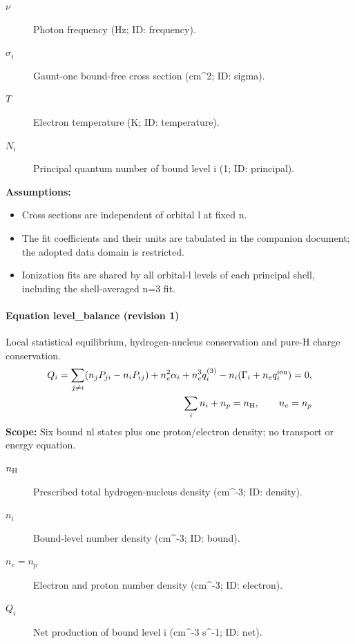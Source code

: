 \begin{description}
\item[$\nu$] Photon frequency (Hz; ID: frequency).
\item[$\sigma_i$] Gaunt-one bound-free cross section (cm\textasciicircum{}2; ID: sigma).
\item[$T$] Electron temperature (K; ID: temperature).
\item[$N_i$] Principal quantum number of bound level i (1; ID: principal).
\end{description}

\noindent\textbf{Assumptions:}
\begin{itemize}
\item Cross sections are independent of orbital l at fixed n.
\item The fit coefficients and their units are tabulated in the companion document; the adopted data domain is restricted.
\item Ionization fits are shared by all orbital-l levels of each principal shell, including the shell-averaged n=3 fit.
\end{itemize}

\paragraph{Equation level\_balance (revision 1)}
Local statistical equilibrium, hydrogen-nucleus conservation and pure-H charge conservation.
\begin{equation}
\begin{aligned}
Q_i=\sum_{j\ne i}(n_jP_{ji}-n_iP_{ij})+n_e^2\alpha_i+n_e^3q_i^{(3)}-n_i(\Gamma_i+n_eq_i^{\rm ion})=0,\\\sum_i n_i+n_p=n_{\rm H},\qquad n_e=n_p
\end{aligned}
\label{eq:escape.hydrogen_5f_nlte:level_5f_balance:1}
\end{equation}
\noindent\textbf{Scope:} Six bound nl states plus one proton/electron density; no transport or energy equation.

\begin{description}
\item[$n_{\rm H}$] Prescribed total hydrogen-nucleus density (cm\textasciicircum{}-3; ID: density).
\item[$n_i$] Bound-level number density (cm\textasciicircum{}-3; ID: bound).
\item[$n_e=n_p$] Electron and proton number density (cm\textasciicircum{}-3; ID: electron).
\item[$Q_i$] Net production of bound level i (cm\textasciicircum{}-3 s\textasciicircum{}-1; ID: net).
\end{description}

